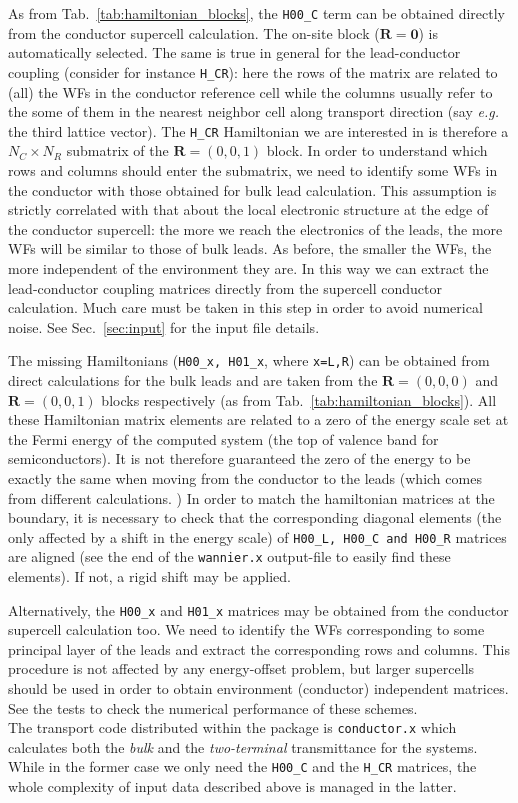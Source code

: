 As from Tab.~\ref{tab:hamiltonian_blocks}, the {\tt H00\_C} term
can be obtained directly from the conductor supercell calculation.
The on-site block ($\mathbf{R}=\mathbf{0}$) is automatically
selected. The same is true in general for the lead-conductor
coupling (consider for instance {\tt H\_CR}): here the rows of the
matrix are related to (all) the WFs in the conductor reference
cell while the columns usually refer to the some of them in the
nearest neighbor cell along transport direction (say {\it e.g.}
the third lattice vector). The {\tt H\_CR} Hamiltonian we are
interested in is therefore a $N_C \times N_R$ submatrix of the
$\mathbf{R}=(0,0,1)$ block. In order to understand which rows and
columns should enter the submatrix, we need to identify some WFs
in the conductor with those obtained for bulk lead calculation.
This assumption is strictly correlated with that about the local
electronic structure at the edge of the conductor supercell: the
more we reach the electronics of the leads, the more WFs will be
similar to those of bulk leads. As before, the smaller the WFs,
the more independent of the environment they are. In this way we
can extract the lead-conductor coupling matrices directly from the
supercell conductor calculation. Much care must be taken in this
step in order to avoid numerical noise. See Sec.~\ref{sec:input}
for the input file details.

The missing Hamiltonians ({\tt H00\_x, H01\_x}, where {\tt x=L,R})
can be obtained from direct calculations for the bulk leads and
are taken from the $\mathbf{R}=(0,0,0)$ and $\mathbf{R}=(0,0,1)$
blocks respectively (as from Tab.~\ref{tab:hamiltonian_blocks}).
All these Hamiltonian matrix elements are related to a zero of the
energy scale set at the Fermi energy of the computed system (the
top of valence band for semiconductors). It is not therefore
guaranteed the zero of the energy to be exactly the same when
moving from the conductor to the leads (which comes from different
calculations. ) In order to match the hamiltonian matrices at the
boundary, it is necessary to check that the corresponding diagonal
elements (the only affected by a shift in the energy scale) of
{\tt H00\_L, H00\_C and H00\_R} matrices are aligned (see the end
of the {\tt wannier.x} output-file to easily find these elements).
If not, a rigid shift may be applied.

Alternatively, the {\tt H00\_x} and {\tt H01\_x} matrices may be
obtained from the conductor supercell calculation too. We need to
identify the WFs corresponding to some principal layer of the
leads and extract the corresponding rows and columns. This
procedure is not affected by any energy-offset problem, but larger
supercells should be used in order to obtain environment
(conductor) independent matrices. See the tests to check the
numerical performance of these schemes.
%
\\

\noindent The transport code distributed within the \WANT package is
{\tt conductor.x} which calculates both the
{\em bulk} and the {\em two-terminal} transmittance for the systems.
While in the former case we
only need the {\tt H00\_C} and the {\tt H\_CR} matrices, the whole complexity
of input data described above is managed in the latter.
